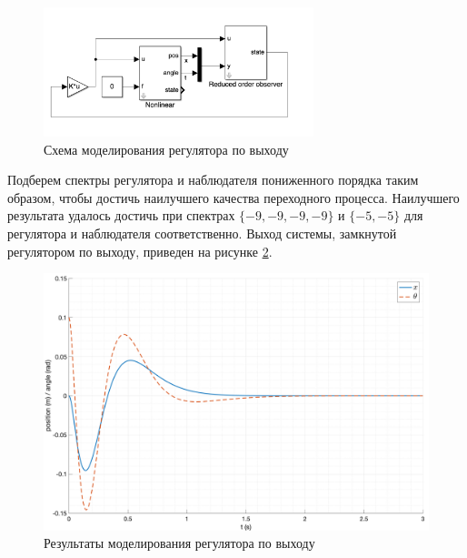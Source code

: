 \begin{figure}[ht!]
    \centering
    \includegraphics[width=0.7\textwidth]{media/model_controller_observer.png}
    \caption{Схема моделирования регулятора по выходу}
    \label{fig:modal_controller_obderver}
\end{figure} 

Подберем спектры регулятора и наблюдателя пониженного порядка таким образом, чтобы 
достичь наилучшего качества переходного процесса. Наилучшего результата удалось достичь при
спектрах $\{-9, -9, -9, -9\}$ и $\{-5, -5\}$ для регулятора и наблюдателя соответственно. 
Выход системы, замкнутой регулятором по выходу, приведен на рисунке \ref{fig:modal_controller_obderver_out}.
\begin{figure}[ht!]
    \centering
    \includegraphics[width=\textwidth]{media/plots/observer_controoler/observer_controller_out.png}
    \caption{Результаты моделирования регулятора по выходу}
    \label{fig:modal_controller_obderver_out}
\end{figure}

